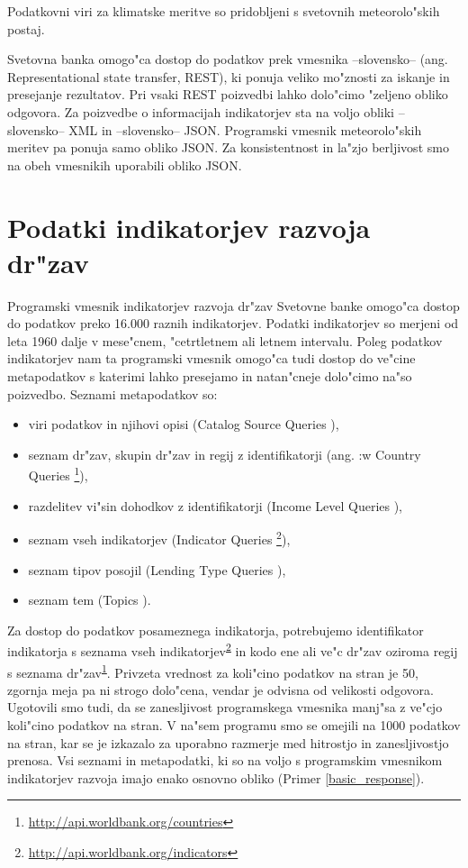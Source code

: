 Podatkovni viri za klimatske meritve so pridobljeni s svetovnih meteorolo"skih 
postaj.


Svetovna banka omogo"ca dostop do podatkov prek vmesnika --slovensko-- 
(ang. Representational state transfer, REST), ki ponuja 
veliko mo"znosti za iskanje in presejanje rezultatov. Pri vsaki REST poizvedbi
lahko dolo"cimo "zeljeno obliko odgovora. Za poizvedbe o informacijah 
indikatorjev sta na voljo obliki --slovensko-- XML in --slovensko-- JSON. 
Programski vmesnik meteorolo"skih
meritev pa ponuja samo obliko JSON. Za konsistentnost in la"zjo berljivost smo
na obeh vmesnikih uporabili obliko JSON. 


\section{Podatki indikatorjev razvoja dr"zav}



Programski vmesnik indikatorjev razvoja dr"zav Svetovne banke omogo"ca dostop
do podatkov preko 16.000 raznih indikatorjev. Podatki indikatorjev so merjeni
od leta 1960 dalje v mese"cnem, "cetrtletnem ali letnem intervalu. Poleg podatkov
indikatorjev nam ta programski vmesnik omogo"ca tudi dostop do ve"cine
metapodatkov s katerimi lahko presejamo in natan"cneje dolo"cimo na"so poizvedbo.
Seznami metapodatkov so:
\begin{itemize}
\item viri podatkov in njihovi opisi (Catalog Source Queries
	),
\item seznam dr"zav, skupin dr"zav in regij z identifikatorji (ang. :w
  Country Queries
	\footnote{\label{country_list}\url{http://api.worldbank.org/countries}}),
\item razdelitev vi"sin dohodkov z identifikatorji (Income Level Queries
	),
\item seznam vseh indikatorjev (Indicator Queries
    \footnote{\label{indicators_list}\url{http://api.worldbank.org/indicators}}),
\item seznam tipov posojil (Lending Type Queries
	),
\item seznam tem (Topics ).
\end{itemize}


Za dostop do podatkov posameznega indikatorja, potrebujemo identifikator
indikatorja s seznama vseh 
indikatorjev\textsuperscript{\ref{indicators_list}} in kodo ene ali ve"c
dr"zav oziroma regij s seznama 
dr"zav\textsuperscript{\ref{country_list}}. Privzeta vrednost za
koli"cino podatkov na stran je 50, zgornja meja pa ni strogo dolo"cena, vendar
je odvisna od velikosti odgovora. Ugotovili smo tudi, da se zanesljivost
programskega vmesnika manj"sa z ve"cjo koli"cino podatkov na stran. V na"sem 
programu smo se omejili na 1000 podatkov na stran, kar se je izkazalo za 
uporabno razmerje med hitrostjo in zanesljivostjo prenosa. Vsi seznami in 
metapodatki, ki so na voljo s programskim vmesnikom indikatorjev razvoja imajo
enako osnovno obliko (Primer \ref{basic_response}).


